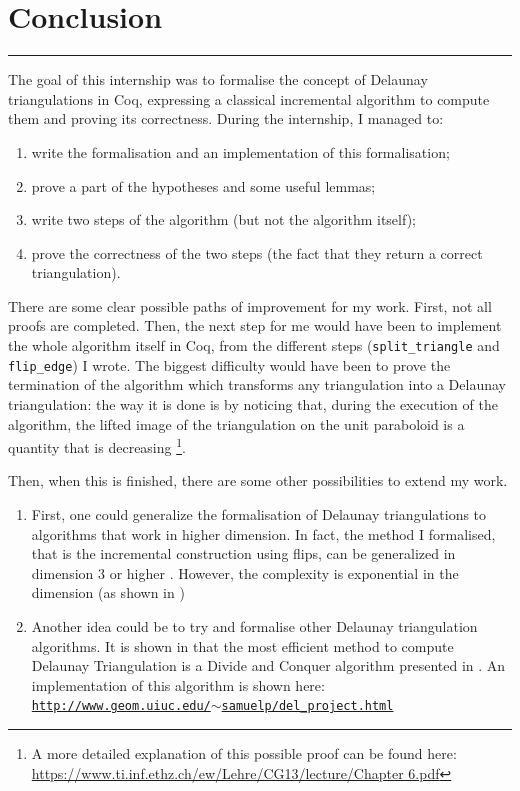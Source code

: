 \documentclass[a4paper,10pt]{article}
\begin{document}
\section{Conclusion}
\rule{\linewidth}{0.5pt}
The goal of this internship was to formalise the concept of Delaunay triangulations in {\sc Coq}, expressing a classical incremental algorithm to compute them and proving its correctness. During the internship, I managed to:
\begin{enumerate}
\item write the formalisation and an implementation of this formalisation;
\item prove a part of the hypotheses and some useful lemmas;
\item write two steps of the algorithm (but not the algorithm itself);
\item prove the correctness of the two steps (the fact that they return a correct triangulation).
\end{enumerate}

There are some clear possible paths of improvement for my work. First, not all proofs are completed. Then, the next step for me would have been to implement the whole algorithm itself in {\sc Coq}, from the different steps ({\tt split\_triangle} and {\tt flip\_edge}) I wrote. The biggest difficulty would have been to prove the termination of the algorithm which transforms any triangulation into a Delaunay triangulation: the way it is done is by noticing that, during the execution of the algorithm, the lifted image of the triangulation on the unit paraboloid is a quantity that is decreasing \cite{Bertot}\footnote{A more detailed explanation of this possible proof can be found here:
\href{https://www.ti.inf.ethz.ch/ew/Lehre/CG13/lecture/Chapter 6.pdf}{https://www.ti.inf.ethz.ch/ew/Lehre/CG13/lecture/Chapter 6.pdf}}.

Then, when this is finished, there are some other possibilities to extend my work.
\begin{enumerate}
\item First, one could generalize the formalisation of Delaunay triangulations to algorithms that work in higher dimension. In fact, the method I formalised, that is the incremental construction using flips, can be generalized in dimension 3 or higher \cite{CompGeoAlgo}. However, the complexity is exponential in the dimension (as shown in \cite{IncrementalDimension})
\item Another idea could be to try and formalise other Delaunay triangulation algorithms. It is shown in \cite{Comparison} that the most efficient method to compute Delaunay Triangulation is a Divide and Conquer algorithm presented in \cite{AlgoDivide}. An implementation of this algorithm is shown here:\\
  \href{http://www.geom.uiuc.edu/~samuelp/del_project.html}{{\tt http://www.geom.uiuc.edu/$\sim$samuelp/del\_project.html}}
\end{enumerate}
\end{document}

